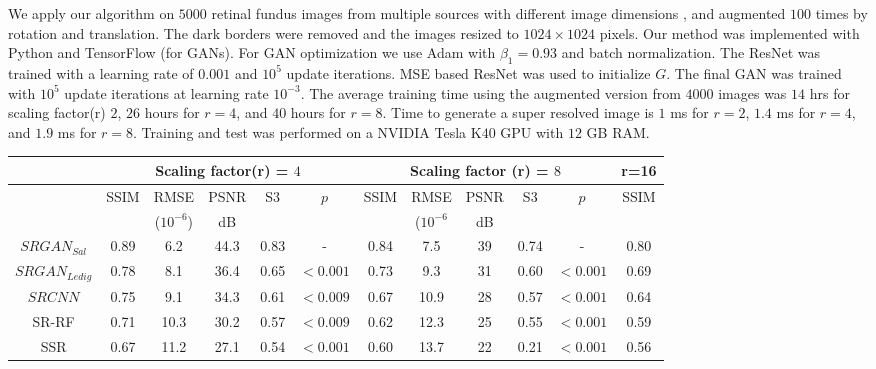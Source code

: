 \documentclass{llncs}
\begin{document}
We apply our algorithm on $5000$ retinal fundus images from multiple sources with different image dimensions \cite{data}, and augmented $100$ times by rotation and translation. The dark borders were removed and the images resized to $1024\times1024$ pixels. Our method was implemented with Python and TensorFlow (for GANs). For GAN optimization we use Adam with $\beta_1=0.93$ and batch normalization. The ResNet was trained with a learning rate of $0.001$ and $10^{5}$ update iterations. MSE based ResNet was used to initialize $G$. The final GAN was trained with $10^{5}$ update iterations at learning rate $10^{-3}$. 
%
The average training time using the augmented version from $4000$ images was $14$ hrs for scaling factor(r) $2$, $26$ hours for $r=4$, and $40$ hours for $r=8$. Time to generate a super resolved image is $1$ ms for $r=2$, $1.4$ ms for $r=4$, and $1.9$ ms for $r=8$. Training and test was performed on a NVIDIA Tesla K$40$ GPU with $12$ GB RAM. %
\begin{tabular}{|c|c|c|c|c|c|c|c|c|c|c|c|}
\hline{} & \multicolumn{5}{|c|}{Scaling factor(r) = $4$} & \multicolumn{5}{|c|}{Scaling factor (r) = $8$} & {r=16} \\  \hline{} & {SSIM} & {RMSE}  & {PSNR} & {S3} & {$p$} & {SSIM} & {RMSE}  & {PSNR} & {S3} & {$p$} & {SSIM} \\ 
{} & {} & {($10^{-6}$)}  & {dB} & {} & {} & {} & {($10^{-6}$}  & {dB} & {} & {} & {}\\ \hline{$SRGAN_{Sal}$} & 0.89 & {6.2} & {44.3}  & 0.83 & - & 0.84 & 7.5 & 39 & 0.74 & - & {0.80} \\ \hline{$SRGAN_{Ledig}$} & {0.78} & {8.1} & 36.4 & 0.65 & $<0.001$ & 0.73 & 9.3 & 31 & 0.60 & $<0.001$  & {0.69} \\  \hline{$SRCNN$}  & {0.75} & {9.1}  & 34.3 & 0.61 & $<0.009$ & 0.67 & 10.9 & 28 & 0.57 &$<0.001$ & {0.64}  \\  \hline{SR-RF}   & {0.71} & {10.3}  & 30.2 & 0.57 & $<0.009$ & 0.62 & 12.3 & 25 & 0.55 & $<0.001$ & {0.59} \\  \hline{SSR}  & {0.67} & {11.2}  & 27.1 & 0.54   & $<0.001$ &  0.60 & 13.7 & 22 & 0.21 & $<0.001$ & {0.56}  \\  \hline
\end{tabular}
\end{document}
